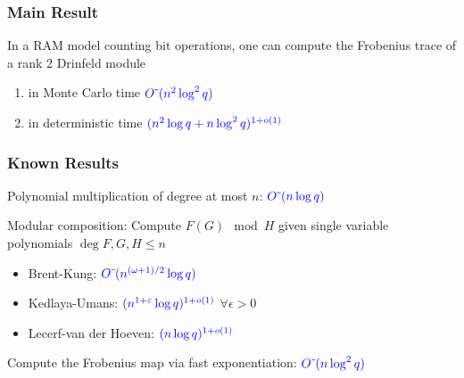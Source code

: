 \documentclass{beamer}
\newcommand{\blue}{\textcolor{blue}}
\newcommand{\spa}{\vspace{0.2cm}}
\begin{document}
\begin{frame}
\frametitle{Main Result}




\begin{theorem}
In a RAM model counting bit operations, one can compute the Frobenius trace of a rank 2 Drinfeld module
\begin{enumerate}
\item in Monte Carlo time $\blue{O\tilde{~}(n^2 \log^2 q)}$
\item in deterministic time $\blue{(n^2 \log q + n \log^2 q)^{1+o(1)}}$

\end{enumerate}
\end{theorem}



\end{frame}






\begin{frame}
\frametitle{Known Results}

Polynomial multiplication of degree at most $n$: $\blue{O\tilde{~}(n\log q)}$


\spa

Modular composition: Compute $F(G) \mod H$ given single variable polynomials $\deg F, G,H \leq n$
\begin{itemize}
\item Brent-Kung: $\blue{O\tilde{~}(n^{(\omega+1)/2}\log q)} $ %
    \item Kedlaya-Umans: $\blue{(n^{1 + \varepsilon}\log q)^{1+o(1)}}$ $\forall \epsilon > 0 $
    \item Lecerf-van der Hoeven: $\blue{(n \log q)^{1+o(1)}}$
\end{itemize}



\spa

Compute the Frobenius map via fast exponentiation: $\blue{O\tilde{~}(n\log^2 q)}$ %
    


\end{frame}
\end{document}
